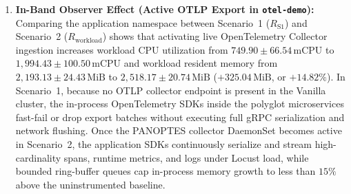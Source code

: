 \begin{enumerate}
    \item \textbf{In-Band Observer Effect (Active OTLP Export in \texttt{otel-demo}):} Comparing the application namespace between Scenario~1 ($R_{\text{S1}}$) and Scenario~2 ($R_{\text{workload}}$) shows that activating live OpenTelemetry Collector ingestion increases workload CPU utilization from $749.90 \pm 66.54\,\text{mCPU}$ to $1{,}994.43 \pm 100.50\,\text{mCPU}$ and workload resident memory from $2{,}193.13 \pm 24.43\,\text{MiB}$ to $2{,}518.17 \pm 20.74\,\text{MiB}$ ($+325.04\,\text{MiB}$, or $+14.82\%$). In Scenario~1, because no OTLP collector endpoint is present in the Vanilla cluster, the in-process OpenTelemetry SDKs inside the polyglot microservices fast-fail or drop export batches without executing full gRPC serialization and network flushing. Once the PANOPTES collector DaemonSet becomes active in Scenario~2, the application SDKs continuously serialize and stream high-cardinality spans, runtime metrics, and logs under Locust load, while bounded ring-buffer queues cap in-process memory growth to less than $15\%$ above the uninstrumented baseline.
    

\end{enumerate}
